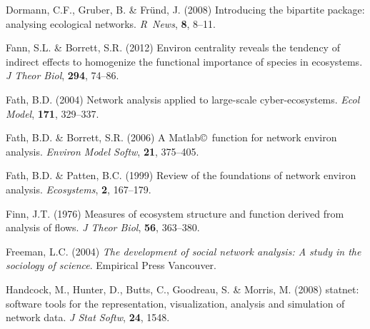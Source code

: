 \documentclass[11pt]{article}
\newcommand{\R}{R}
\begin{document}
\begin{thebibliography}{75}
Dormann, C.F., Gruber, B. \& Fr{\"u}nd, J. (2008) Introducing the bipartite
  package: analysing ecological networks.
\newblock \emph{\R\ News}, \textbf{8}, 8--11.

Fann, S.L. \& Borrett, S.R. (2012) Environ centrality reveals the tendency of
  indirect effects to homogenize the functional importance of species in
  ecosystems.
\newblock \emph{J Theor Biol}, \textbf{294}, 74--86.

Fath, B.D. (2004) Network analysis applied to large-scale cyber-ecosystems.
\newblock \emph{Ecol Model}, \textbf{171}, 329--337.

Fath, B.D. \& Borrett, S.R. (2006) A {Matlab}\copyright\ function for network
  environ analysis.
\newblock \emph{Environ Model Softw}, \textbf{21}, 375--405.

Fath, B.D. \& Patten, B.C. (1999) Review of the foundations of network environ
  analysis.
\newblock \emph{Ecosystems}, \textbf{2}, 167--179.

Finn, J.T. (1976) Measures of ecosystem structure and function derived from
  analysis of flows.
\newblock \emph{J Theor Biol}, \textbf{56}, 363--380.

Freeman, L.C. (2004) \emph{The development of social network analysis: A study
  in the sociology of science}.
\newblock Empirical Press Vancouver.


Handcock, M., Hunter, D., Butts, C., Goodreau, S. \& Morris, M. (2008) statnet:
  software tools for the representation, visualization, analysis and simulation
  of network data.
\newblock \emph{J Stat Softw}, \textbf{24}, 1548.


\end{thebibliography}
\end{document}
